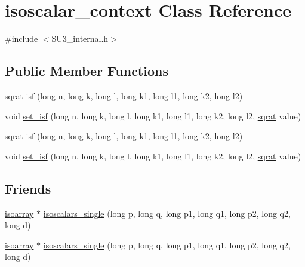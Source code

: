 \hypertarget{classisoscalar__context}{}\section{isoscalar\+\_\+context Class Reference}
\label{classisoscalar__context}


{\ttfamily \#include $<$S\+U3\+\_\+internal.\+h$>$}

\subsection*{Public Member Functions}
\begin{DoxyCompactItemize}
\item 
\mbox{\hyperlink{classsqrat}{sqrat}} \mbox{\hyperlink{classisoscalar__context_a32e31f72a30e0b6b5bd694267132bdc7}{isf}} (long n, long k, long l, long k1, long l1, long k2, long l2)
\item 
void \mbox{\hyperlink{classisoscalar__context_a3331c9cd09a538d5705a6a1ad75a3d99}{set\+\_\+isf}} (long n, long k, long l, long k1, long l1, long k2, long l2, \mbox{\hyperlink{classsqrat}{sqrat}} value)
\item 
\mbox{\hyperlink{classsqrat}{sqrat}} \mbox{\hyperlink{classisoscalar__context_a32e31f72a30e0b6b5bd694267132bdc7}{isf}} (long n, long k, long l, long k1, long l1, long k2, long l2)
\item 
void \mbox{\hyperlink{classisoscalar__context_a3331c9cd09a538d5705a6a1ad75a3d99}{set\+\_\+isf}} (long n, long k, long l, long k1, long l1, long k2, long l2, \mbox{\hyperlink{classsqrat}{sqrat}} value)
\end{DoxyCompactItemize}
\subsection*{Friends}
\begin{DoxyCompactItemize}
\item 
\mbox{\hyperlink{classisoarray}{isoarray}} $\ast$ \mbox{\hyperlink{classisoscalar__context_a79b9e82efcee0dcd9db337a918244131}{isoscalars\+\_\+single}} (long p, long q, long p1, long q1, long p2, long q2, long d)
\item 
\mbox{\hyperlink{classisoarray}{isoarray}} $\ast$ \mbox{\hyperlink{classisoscalar__context_a79b9e82efcee0dcd9db337a918244131}{isoscalars\+\_\+single}} (long p, long q, long p1, long q1, long p2, long q2, long d)
\end{DoxyCompactItemize}


